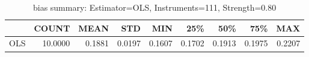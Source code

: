 \begin{table}[ht]
\centering
\caption{bias summary: Estimator=OLS, Instruments=111, Strength=0.80}
\begin{tabular}{lrrrrrrrr}
\toprule
 & COUNT & MEAN & STD & MIN & 25\% & 50\% & 75\% & MAX \\
\midrule
OLS & 10.0000 & 0.1881 & 0.0197 & 0.1607 & 0.1702 & 0.1913 & 0.1975 & 0.2207 \\
\bottomrule
\end{tabular}
\end{table}

